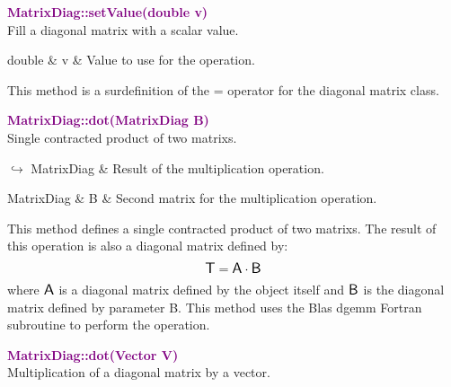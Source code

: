 \textcolor{purple}{\textbf{MatrixDiag::setValue(double v)}}\label{MatrixDiag::setValue(double v)}\\
Fill a diagonal matrix with a scalar value.

\begin{tcolorbox}[width=\textwidth,myArgs,tabularx={ll|R}]
double & v & Value to use for the operation.
\end{tcolorbox}

This method is a surdefinition of the = operator for the diagonal matrix class.

\textcolor{purple}{\textbf{MatrixDiag::dot(MatrixDiag B)}}\label{MatrixDiag::dot(MatrixDiag B)}\\
Single contracted product of two matrixs.\vspace*{-0.5em}
\begin{tcolorbox}[grow to left by=-1cm, width=\textwidth-1cm,myArgs,tabularx={l|R}]
$\hookrightarrow$ MatrixDiag & Result of the multiplication operation.
\end{tcolorbox}

\begin{tcolorbox}[width=\textwidth,myArgs,tabularx={ll|R}]
MatrixDiag & B & Second matrix for the multiplication operation.
\end{tcolorbox}

This method defines a single contracted product of two matrixs.
The result of this operation is also a diagonal matrix defined by:
\begin{equation*}
\mbox{\large\ensuremath{\mathsf{T}}} = \mbox{\large\ensuremath{\mathsf{A}}} \cdot \mbox{\large\ensuremath{\mathsf{B}}}
\end{equation*}
where $\mbox{\large\ensuremath{\mathsf{A}}}$ is a diagonal matrix defined by the object itself and $\mbox{\large\ensuremath{\mathsf{B}}}$ is the diagonal matrix defined by parameter B.
This method uses the Blas \textsf{dgemm} Fortran subroutine to perform the operation.

\textcolor{purple}{\textbf{MatrixDiag::dot(Vector V)}}\label{MatrixDiag::dot(Vector V)}\\
Multiplication of a diagonal matrix by a vector.

